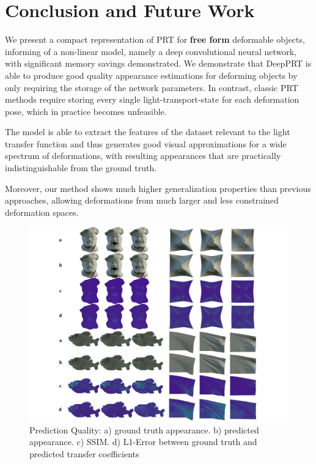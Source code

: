 \section{Conclusion and Future Work}
We present a compact representation of PRT for \textbf{free form} deformable objects, informing of a non-linear model, namely a deep convolutional neural network, with significant memory savings demonstrated. We demonstrate that DeepPRT is able to produce good quality appearance estimations for deforming objects by only requiring the storage of the network parameters. In contrast, classic PRT methods require storing every single light-transport-state for each deformation pose, which in practice becomes unfeasible.

The model is able to extract the features of the dataset relevant to the light transfer function and thus generates good visual approximations for a wide spectrum of deformations, with resulting appearances that are practically indistinguishable from the ground truth.  

Moreover, our method shows much higher generalization properties than previous approaches, allowing deformations from much larger and less constrained deformation spaces.

\begin{figure}[H]
  \centering
    \includegraphics[width=1.0\textwidth]{Figures/DPRT_quality_SSIM.pdf}
     \caption{Prediction Quality:
     a) ground truth appearance. b) predicted appearance. c) SSIM. d) L1-Error between ground truth and predicted transfer coefficients }
     \label{Fig: DPRT_Quality}
\end{figure}

